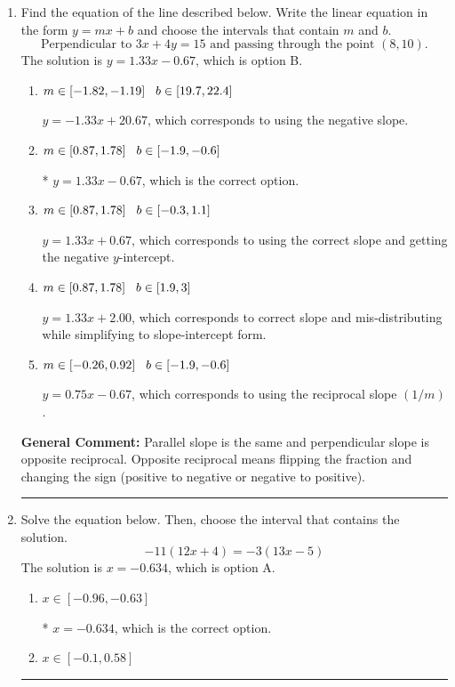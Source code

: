 \documentclass{extbook}[14pt]
\newcommand{\litem}[1]{\item #1

\rule{\textwidth}{0.4pt}}
\begin{document}
\begin{enumerate}\litem{
Find the equation of the line described below. Write the linear equation in the form $ y=mx+b $ and choose the intervals that contain $m$ and $b$.
\[ \text{Perpendicular to } 3 x + 4 y = 15 \text{ and passing through the point } (8, 10). \]The solution is \( y = 1.33x - 0.67 \), which is option B.\begin{enumerate}[label=\Alph*.]
\item \( m \in [-1.82, -1.19] \hspace*{3mm} b \in [19.7, 22.4] \)

 $y = -1.33x + 20.67$, which corresponds to using the negative slope.
\item \( m \in [0.87, 1.78] \hspace*{3mm} b \in [-1.9, -0.6] \)

* $y = 1.33x - 0.67$, which is the correct option.
\item \( m \in [0.87, 1.78] \hspace*{3mm} b \in [-0.3, 1.1] \)

 $y = 1.33x + 0.67$, which corresponds to using the correct slope and getting the negative $y$-intercept.
\item \( m \in [0.87, 1.78] \hspace*{3mm} b \in [1.9, 3] \)

 $y = 1.33x + 2.00$, which corresponds to correct slope and mis-distributing while simplifying to slope-intercept form.
\item \( m \in [-0.26, 0.92] \hspace*{3mm} b \in [-1.9, -0.6] \)

 $y = 0.75x - 0.67$, which corresponds to using the reciprocal slope $(1/m)$.
\end{enumerate}

\textbf{General Comment:} Parallel slope is the same and perpendicular slope is opposite reciprocal. Opposite reciprocal means flipping the fraction and changing the sign (positive to negative or negative to positive).
}
\litem{
Solve the equation below. Then, choose the interval that contains the solution.
\[ -11(12x + 4) = -3(13x -5) \]The solution is \( x = -0.634 \), which is option A.\begin{enumerate}[label=\Alph*.]
\item \( x \in [-0.96, -0.63] \)

* $x = -0.634$, which is the correct option.
\item \( x \in [-0.1, 0.58] \)


\end{enumerate}}
\end{enumerate}
\end{document}
